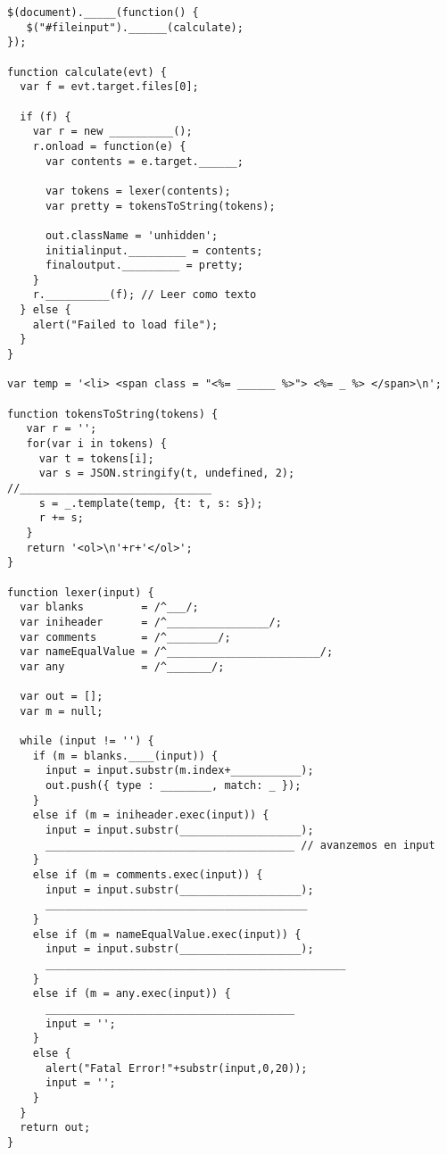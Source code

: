 \begin{enumerate}
\begin{verbatim}
$(document)._____(function() {
   $("#fileinput").______(calculate);
});

function calculate(evt) {
  var f = evt.target.files[0]; 

  if (f) {
    var r = new __________();
    r.onload = function(e) { 
      var contents = e.target.______;
      
      var tokens = lexer(contents);
      var pretty = tokensToString(tokens);
      
      out.className = 'unhidden';
      initialinput._________ = contents;
      finaloutput._________ = pretty;
    }
    r.__________(f); // Leer como texto
  } else { 
    alert("Failed to load file");
  }
}

var temp = '<li> <span class = "<%= ______ %>"> <%= _ %> </span>\n';

function tokensToString(tokens) {
   var r = '';
   for(var i in tokens) {
     var t = tokens[i];
     var s = JSON.stringify(t, undefined, 2); //______________________________
     s = _.template(temp, {t: t, s: s});
     r += s;
   }
   return '<ol>\n'+r+'</ol>';
}

function lexer(input) {
  var blanks         = /^___/;
  var iniheader      = /^________________/;
  var comments       = /^________/;
  var nameEqualValue = /^________________________/;
  var any            = /^_______/;

  var out = [];
  var m = null;

  while (input != '') {
    if (m = blanks.____(input)) {
      input = input.substr(m.index+___________);
      out.push({ type : ________, match: _ });
    }
    else if (m = iniheader.exec(input)) {
      input = input.substr(___________________);
      _______________________________________ // avanzemos en input
    }
    else if (m = comments.exec(input)) {
      input = input.substr(___________________);
      _________________________________________
    }
    else if (m = nameEqualValue.exec(input)) {
      input = input.substr(___________________);
      _______________________________________________
    }
    else if (m = any.exec(input)) {
      _______________________________________
      input = '';
    }
    else {
      alert("Fatal Error!"+substr(input,0,20));
      input = '';
    }
  }
  return out;
}
\end{verbatim}
\end{enumerate}

